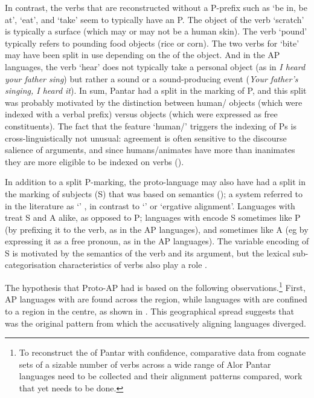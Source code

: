 \documentclass[output=paper]{LSP/langsci}
\begin{document}
\largerpage[-2]
In contrast, the verbs that are reconstructed without a P-prefix such as `be in, be at', `eat', and `take' seem to typically have an  P. The object of the verb `scratch' is typically a surface (which may or may not be a human skin). The verb `pound' typically refers to pounding food objects (\eg rice or corn). The two verbs for `bite' may have been split in use depending on the  of the object. And in the AP languages, the verb `hear' does not typically take a personal object (as in \textit{I heard your father sing}) but rather a sound or a sound-producing event (\eg \textit{Your father's singing, I heard it}). In sum,  Pantar had a split in the marking of P, and this split was probably motivated by the distinction between human/ objects (which were indexed with a verbal prefix) versus  objects (which were expressed as free constituents). The fact that the feature `human/' triggers the indexing of Ps is cross-linguistically not unusual: agreement is often sensitive to the discourse salience of arguments, and since humans/animates have more  than inanimates they are more eligible to be indexed on verbs (\cf \citealt{Dalrympleetal2011Objects}).

In addition to a split P-marking, the proto-language may also have had a split in the marking of  subjects (S) that was based on semantics (\citealt{Klamer2012Dressing,Robinsonetal2014Reconstructing}); a system
referred to in the literature as ‘’ \citep{Mithun1991Active,Donohueetal2008Typology}, in contrast to `' or `ergative alignment'. Languages with  treat S and A alike, as opposed to P; languages with  encode S sometimes like P (by prefixing it to the verb, as in the AP languages), and sometimes like A (eg by expressing it as a free pronoun, as in the AP languages). The variable encoding of S is motivated by the semantics of the verb and its argument, but the lexical sub-categorisation characteristics of verbs also play a role \citep[cf.][]{Feddenetal2013Feddenetal,Feddenetal2014Variation}.

The hypothesis that Proto-AP had  is based on the following observations.\footnote{To reconstruct the  of  Pantar with confidence, comparative data from cognate sets of a sizable number of verbs across a wide range of Alor Pantar languages need to be collected and their alignment patterns compared, work that yet needs to be done.} First, AP languages with  are found across the region, while languages with  are confined to a region in the centre, as shown in . This geographical spread suggests that  was the original pattern from which the accusatively aligning languages diverged. 
\end{document}
